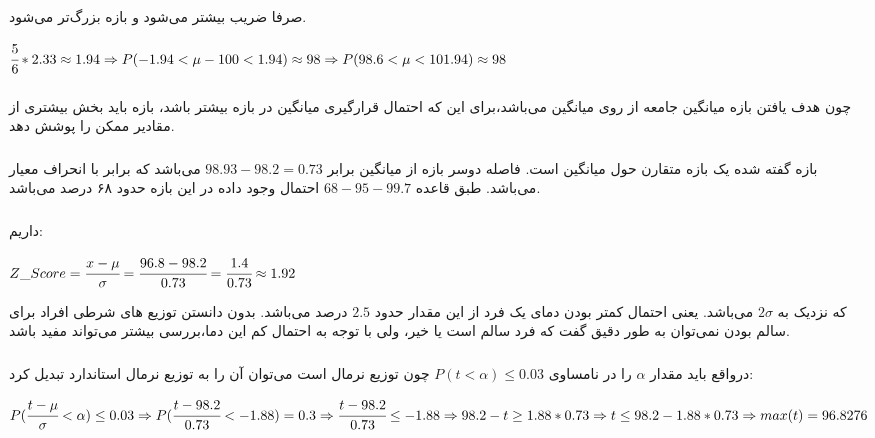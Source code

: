 \documentclass[12pt]{article}
\begin{document}
	\subsubsection*{ }
	صرفا ضریب  بیشتر می‌شود و بازه بزرگ‌تر می‌شود. 
 	\begin{latin}
 		$
 		\cfrac{5}{6} * 2.33 \approx 1.94 \Rightarrow P(-1.94 < \mu - 100 < 1.94) \approx 98 \Rightarrow P(98.6 < \mu < 101.94) \approx 98
 		$
 	\end{latin}
 	\subsubsection*{}
چون هدف یافتن بازه میانگین جامعه از روی میانگین 
می‌باشد،‌برای این که احتمال قرارگیری میانگین در بازه بیشتر باشد، بازه باید بخش بیشتری از مقادیر ممکن را پوشش دهد.
\subsubsection{}
بازه گفته شده یک بازه متقارن حول میانگین است. فاصله دوسر بازه از میانگین برابر 
$
98.93 - 98.2 = 0.73 
$
می‌باشد که برابر با انحراف معیار می‌باشد. طبق قاعده $68-95-99.7$ احتمال وجود داده در این بازه حدود ۶۸ درصد می‌باشد.
\subsubsection{}
داریم:
\begin{latin}
	$
	Z\_Score = \cfrac{x - \mu}{\sigma} = \cfrac{96.8 - 98.2}{0.73} = \cfrac{1.4}{0.73} \approx 1.92
	$
\end{latin}
که نزدیک به
$2\sigma$ 
می‌باشد. یعنی احتمال کمتر بودن دمای یک فرد از این مقدار حدود $ 2.5$ درصد می‌باشد. بدون دانستن توزیع های شرطی افراد برای سالم بودن نمی‌توان به طور دقیق گفت که فرد سالم است یا خیر، ولی با توجه به احتمال کم این دما،‌بررسی بیشتر می‌تواند مفید باشد.
\subsubsection{}
درواقع باید مقدار 
$\alpha$ 
را در نامساوی 
$
P(t < \alpha) \leq 0.03
$
چون توزیع نرمال است می‌توان آن را به توزیع نرمال استاندارد تبدیل کرد:
\begin{latin}
	$
	P(\cfrac{t - \mu}{\sigma} < \alpha) \leq 0.03 \Rightarrow P(\cfrac{t - 98.2}{0.73} < -1.88) = 0.3 \Rightarrow \cfrac{t - 98.2}{0.73} \leq -1.88  \Rightarrow 98.2 - t \geq 1.88 * 0.73 \Rightarrow t \leq 98.2 - 1.88 * 0.73  \Rightarrow max(t) = 96.8276 
	$
\end{latin}
\end{document}
